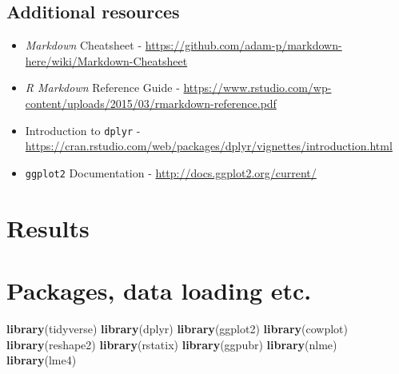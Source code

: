 \documentclass[twoside,12pt,final]{ucthesis-CA2012}
\newenvironment{Shaded}{}{}
\newcommand{\KeywordTok}[1]{\textcolor[rgb]{0.00,0.44,0.13}{\textbf{{#1}}}}
\newcommand{\NormalTok}[1]{{#1}}
\begin{document}
\begin{ucmainmatter}
\hypertarget{additional-resources}{%
\section{Additional resources}\label{additional-resources}}
\begin{itemize}
\item
  \emph{Markdown} Cheatsheet - \url{https://github.com/adam-p/markdown-here/wiki/Markdown-Cheatsheet}
\item
  \emph{R Markdown} Reference Guide - \url{https://www.rstudio.com/wp-content/uploads/2015/03/rmarkdown-reference.pdf}
\item
  Introduction to \texttt{dplyr} - \url{https://cran.rstudio.com/web/packages/dplyr/vignettes/introduction.html}
\item
  \texttt{ggplot2} Documentation - \url{http://docs.ggplot2.org/current/}
\end{itemize}
\hypertarget{math-sci}{%
\chapter{Results}\label{math-sci}}

\hypertarget{packages-data-loading-etc.}{%
\chapter{Packages, data loading etc.}\label{packages-data-loading-etc.}}
\begin{Shaded}
\begin{Highlighting}[]
\KeywordTok{library}\NormalTok{(tidyverse)}
\KeywordTok{library}\NormalTok{(dplyr)}
\KeywordTok{library}\NormalTok{(ggplot2)}
\KeywordTok{library}\NormalTok{(cowplot)}
\KeywordTok{library}\NormalTok{(reshape2)}
\KeywordTok{library}\NormalTok{(rstatix)}
\KeywordTok{library}\NormalTok{(ggpubr)}
\KeywordTok{library}\NormalTok{(nlme)}
\KeywordTok{library}\NormalTok{(lme4)}
\end{Highlighting}
\end{Shaded}
\hypertarget{basic-statistics-and-data-mangling}{%
}
\end{ucmainmatter}
\end{document}
